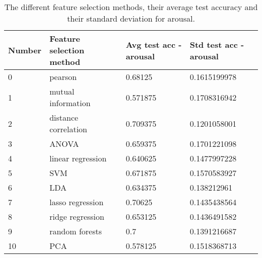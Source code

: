 \begin{table}[H]
\centering
\begin{tabular}{llll}
\textbf{Number} & \textbf{Feature selection method} & \textbf{Avg test acc - arousal} & \textbf{Std test acc - arousal} \\ \hline
0               & pearson                           & 0.68125                             & 0.1615199978                    \\
1               & mutual information                & 0.571875                            & 0.1708316942                    \\
2               & distance correlation              & 0.709375                            & 0.1201058001                    \\
3               & ANOVA                             & 0.659375                            & 0.1701221098                    \\
4               & linear regression                 & 0.640625                            & 0.1477997228                    \\
5               & SVM                               & 0.671875                            & 0.1570583927                    \\
6               & LDA                               & 0.634375                            & 0.138212961                     \\
7               & lasso regression                  & 0.70625                             & 0.1435438564                    \\
8               & ridge regression                  & 0.653125                            & 0.1436491582                    \\
9               & random forests                    & 0.7                                 & 0.1391216687                    \\
10              & PCA                               & 0.578125                            & 0.1518368713                   
\end{tabular}
\caption{The different feature selection methods, their average test accuracy and their standard deviation for arousal\label{accCompLblarousal}.}
\end{table}


